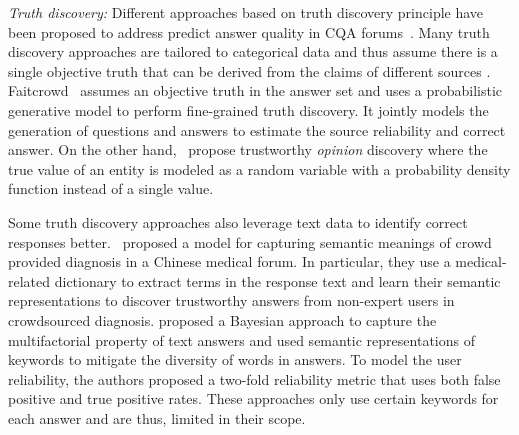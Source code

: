 \noindent
\emph{Truth discovery:} Different approaches based on truth discovery principle have been proposed to address predict answer quality in CQA forums~\cite{zhang2018texttruth, li2015discovery, zheng2017truth,li2016crowdsourcing,mukherjee2016truthcore,vydiswaran2011content}. Many truth discovery approaches are tailored to categorical data and thus assume there is a single objective truth that can be derived from the claims of different sources \cite{li2016survey}. Faitcrowd~\cite{ma2015faitcrowd} assumes an objective truth in the answer set and uses a probabilistic generative model to perform fine-grained truth discovery. It jointly models the generation of questions and answers to estimate the source reliability and correct answer. On the other hand,~\citet{wan2016truth} propose trustworthy \emph{opinion} discovery where the true value of an entity is modeled as a random variable with a probability density function instead of a single value.

Some truth discovery approaches also leverage text data to identify correct responses better.~\citet{li2017reliable} proposed a model for capturing semantic meanings of crowd provided diagnosis in a Chinese medical forum. In particular, they use a medical-related dictionary to extract terms in the response text and learn their semantic representations to discover trustworthy answers from non-expert users in crowdsourced diagnosis.
\citet{zhang2018texttruth} proposed a Bayesian approach to capture the multifactorial property of text answers and used semantic representations of keywords to mitigate the diversity of words in answers. To model the user reliability, the authors proposed a two-fold reliability metric that uses both false positive and true positive rates. These approaches only use certain keywords for each answer and are thus, limited in their scope.
